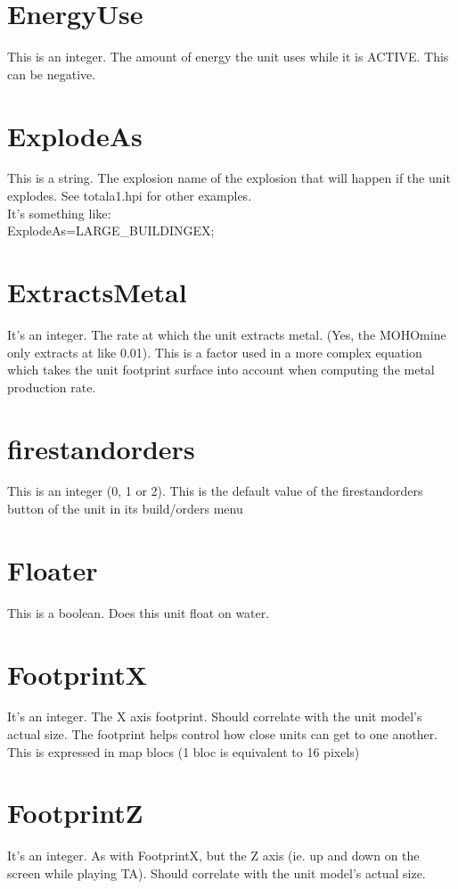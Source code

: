 \documentclass[a4paper,10pt]{article}
\begin{document}
\section{EnergyUse}
This is an integer. The amount of energy the unit uses while it is ACTIVE. This can be negative.

\section{ExplodeAs}
This is a string. The explosion name of the explosion that will happen if the unit explodes. See totala1.hpi for other examples.\\
It's something like:\\
ExplodeAs=LARGE\_BUILDINGEX;

\section{ExtractsMetal}
It's an integer. The rate at which the unit extracts metal. (Yes, the MOHOmine only extracts at like 0.01). This is a factor used in a more complex equation which takes the unit footprint surface into account when computing the metal production rate.

\section{firestandorders}
This is an integer (0, 1 or 2). This is the default value of the firestandorders button of the unit in its build/orders menu

\section{Floater}
This is a boolean. Does this unit float on water.

\section{FootprintX}
It's an integer. The X axis footprint. Should correlate with the unit model's actual size. The footprint helps control how close units can get to one another. This is expressed in map blocs (1 bloc is equivalent to 16 pixels)

\section{FootprintZ}
It's an integer. As with FootprintX, but the Z axis (ie. up and down on the screen while playing TA). Should correlate with the unit model's actual size.
\end{document}
